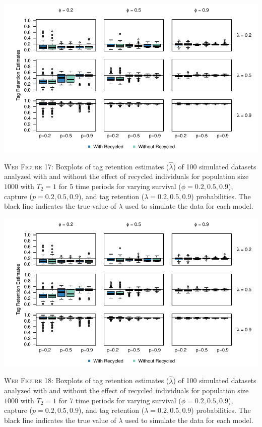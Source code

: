 \documentclass[]{article}
\begin{document}
\newpage

\includegraphics{Appendix_files/figure-latex/17_tagretention_GJSTL5-1.pdf}

\textsc{Web Figure 17:} Boxplots of tag retention estimates
(\(\hat{\lambda}\)) of 100 simulated datasets analyzed with and without
the effect of recycled individuals for population size \(1000\) with
\(T_2=1\) for 5 time periods for varying survival
(\(\phi=0.2,0.5,0.9\)), capture (\(p=0.2,0.5,0.9\)), and tag retention
(\(\lambda=0.2,0.5,0.9\)) probabilities. The black line indicates the
true value of \(\lambda\) used to simulate the data for each model.

\includegraphics{Appendix_files/figure-latex/18_tagretention_GJSTL6-1.pdf}

\textsc{Web Figure 18:} Boxplots of tag retention estimates
(\(\hat{\lambda}\)) of 100 simulated datasets analyzed with and without
the effect of recycled individuals for population size \(1000\) with
\(T_2=1\) for 7 time periods for varying survival
(\(\phi=0.2,0.5,0.9\)), capture (\(p=0.2,0.5,0.9\)), and tag retention
(\(\lambda=0.2,0.5,0.9\)) probabilities. The black line indicates the
true value of \(\lambda\) used to simulate the data for each model.
\end{document}
